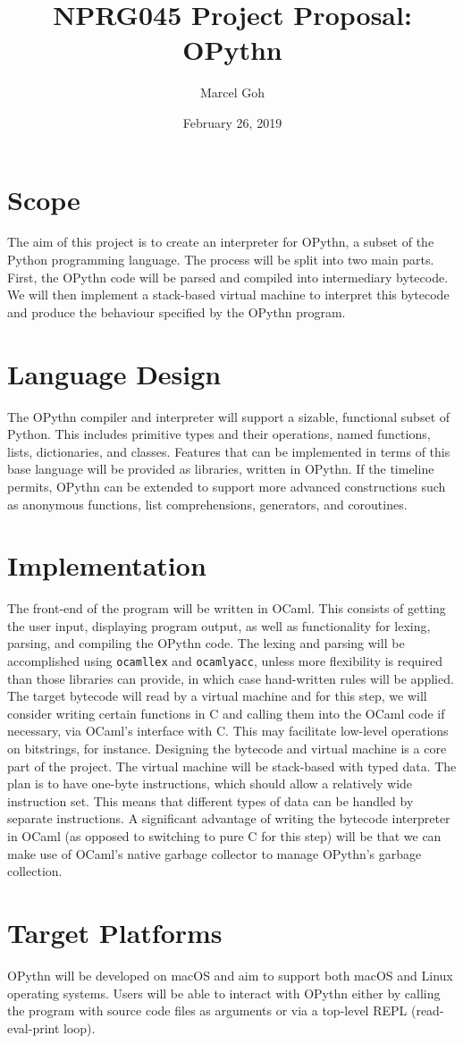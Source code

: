 \documentclass[11pt]{article}
\begin{document}
 
\date{February 26, 2019}
\title{\textbf{NPRG045 Project Proposal: OPythn}}
\author{Marcel Goh}
\maketitle

\section{Scope}
The aim of this project is to create an interpreter for OPythn, a subset of the Python programming language. The process will be split into two main parts. First, the OPythn code will be parsed and compiled into intermediary bytecode. We will then implement a stack-based virtual machine to interpret this bytecode and produce the behaviour specified by the OPythn program.

\section{Language Design}
The OPythn compiler and interpreter will support a sizable, functional subset of Python. This includes primitive types and their operations, named functions, lists, dictionaries, and classes. Features that can be implemented in terms of this base language will be provided as libraries, written in OPythn. If the timeline permits, OPythn can be extended to support more advanced constructions such as anonymous functions, list comprehensions, generators, and coroutines.

\section{Implementation}
The front-end of the program will be written in OCaml. This consists of getting the user input, displaying program output, as well as functionality for lexing, parsing, and compiling the OPythn code. The lexing and parsing will be accomplished using \texttt{ocamllex} and \texttt{ocamlyacc}, unless more flexibility is required than those libraries can provide, in which case hand-written rules will be applied.\\
\indent The target bytecode will read by a virtual machine and for this step, we will consider writing certain functions in C and calling them into the OCaml code if necessary, via OCaml's interface with C. This may facilitate low-level operations on bitstrings, for instance. Designing the bytecode and virtual machine is a core part of the project. The virtual machine will be stack-based with typed data. The plan is to have one-byte instructions, which should allow a relatively wide instruction set. This means that different types of data can be handled by separate instructions. A significant advantage of writing the bytecode interpreter in OCaml (as opposed to switching to pure C for this step) will be that we can make use of OCaml's native garbage collector to manage OPythn's garbage collection.

\section{Target Platforms}
OPythn will be developed on macOS and aim to support both macOS and Linux operating systems. Users will be able to interact with OPythn either by calling the program with source code files as arguments or via a top-level REPL (read-eval-print loop).
\end{document}
